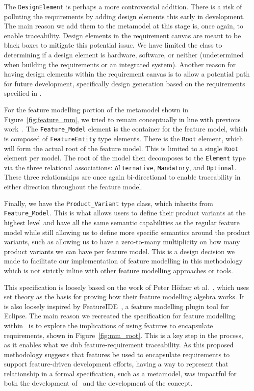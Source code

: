 The \texttt{DesignElement} is perhaps a more controversial addition. There is a risk of polluting the requirements by adding design elements this early in development. The main reason we add them to the metamodel at this stage is, once again, to enable traceability. Design elements in the requirement canvas are meant to be black boxes to mitigate this potential issue. We have limited the class to determining if a design element is hardware, software, or neither (undetermined when building the requirements or an integrated system). Another reason for having design elements within the requirement canvas is to allow a potential path for future development, specifically design generation based on the requirements specified in \tool.

For the feature modelling portion of the metamodel shown in Figure~\ref {fig:feature_mm}, we tried to remain conceptually in line with previous work~\cite{kang1990feature,kang1998form,kang2002feature}. The \texttt{Feature\_Model} element is the container for the feature model, which is composed of \texttt{FeatureEntity} type elements. There is the \texttt{Root} element, which will form the actual root of the feature model. This is limited to a single \texttt{Root} element per model. The root of the model then decomposes to the \texttt{Element} type via the three relational associations: \texttt{Alternative}, \texttt{Mandatory}, and \texttt{Optional}. These three relationships are once again bi-directional to enable traceability in either direction throughout the feature model. 

Finally, we have the \texttt{Product\_Variant} type class, which inherits from \texttt{Feature\_Model}. This is what allows users to define their product variants at the highest level and have all the same semantic capabilities as the regular feature model while still allowing us to define more specific semantics around the product variants, such as allowing us to have a zero-to-many multiplicity on how many product variants we can have per feature model. This is a design decision we made to facilitate our implementation of feature modelling in this methodology which is not strictly inline with other feature modelling approaches or tools.

This specification is loosely based on the work of Peter H\"{o}fner et al.~\cite{hofner2006feature,hofner2011algebra}, which uses set theory as the basis for proving how their feature modelling algebra works. It is also loosely inspired by FeatureIDE~\cite{kastner2009featureide, thum2014featureide}, a feature modelling plugin tool for Eclipse. The main reason we recreated the specification for feature modelling within \tool\ is to explore the implications of using features to encapsulate requirements, shown in Figure~\ref{fig:mm_root}. This is a key step in the process, as it enables what we dub feature-requirement traceability. As this proposed methodology suggests that features be used to encapsulate requirements to support feature-driven development efforts, having a way to represent that relationship in a formal specification, such as a metamodel, was impactful for both the development of \tool\ and the development of the concept.

